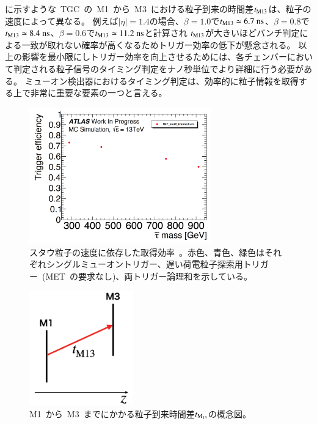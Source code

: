 に示すような~TGC~の~M1~から~M3~における粒子到来の時間差$t_{\rm{M13}}$は、粒子の速度によって異なる。
例えば$|\eta|=1.4$の場合、$\beta=1.0$で$t_{\rm M13}\simeq6.7~\rm ns$、$\beta=0.8$で$t_{\rm M13}\simeq8.4~\rm ns$、$\beta=0.6$で$t_{\rm M13}\simeq11.2~\rm ns$と計算され
$t_{\rm{M13}}$が大きいほどバンチ判定による一致が取れない確率が高くなるためトリガー効率の低下が懸念される。
以上の影響を最小限にしトリガー効率を向上させるためには、各チェンバーにおいて判定される粒子信号のタイミング判定をナノ秒単位でより詳細に行う必要がある。
ミューオン検出器におけるタイミング判定は、効率的に粒子情報を取得する上で非常に重要な要素の一つと言える。
\begin{figure}[H]
        \centering   
        \includegraphics[width=0.7\textwidth,page=4]{img/pdf3/sumi.pdf}
        \caption[スタウ粒子の速度に依存した取得効率]{スタウ粒子の速度に依存した取得効率~\cite{MT:01}。赤色、青色、緑色はそれぞれシングルミューオントリガー、遅い荷電粒子探索用トリガー~(MET~の要求なし)、両トリガー論理和を示している。}
        \label{fig:sumi4}
\end{figure}
\begin{figure}[H]
        \centering   
        \includegraphics[width=0.4\textwidth,page=4]{img/pdf3/time.png}
        \caption[M1~から~M3~までにかかる粒子到来時間差$t_{\rm M_{13}}$の概念図]
        {M1~から~M3~までにかかる粒子到来時間差$t_{\rm M_{13}}$の概念図。}
        \label{fig:time}
\end{figure}

